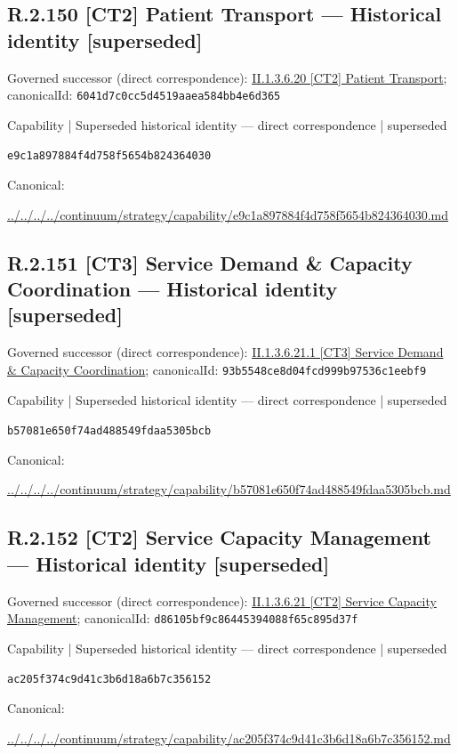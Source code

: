 \documentclass[10pt,a4paper]{article}
\begin{document}
\subsection*{R.2.150 [CT2] Patient Transport — Historical identity [superseded]}
Governed successor (direct correspondence): \hyperref[element-6041d7c0cc5d4519aaea584bb4e6d365]{II.1.3.6.20 [CT2] Patient Transport}; canonicalId: \texttt{6041d7c0cc5d4519aaea584bb4e6d365}\par
\label{element-e9c1a897884f4d758f5654b824364030}
{\small Capability | Superseded historical identity — direct correspondence | superseded}\par
\texttt{e9c1a897884f4d758f5654b824364030}\par
Canonical: \par
{\footnotesize\url{../../../../continuum/strategy/capability/e9c1a897884f4d758f5654b824364030.md}}\par
\subsection*{R.2.151 [CT3] Service Demand \& Capacity Coordination — Historical identity [superseded]}
Governed successor (direct correspondence): \hyperref[element-93b5548ce8d04fcd999b97536c1eebf9]{II.1.3.6.21.1 [CT3] Service Demand \& Capacity Coordination}; canonicalId: \texttt{93b5548ce8d04fcd999b97536c1eebf9}\par
\label{element-b57081e650f74ad488549fdaa5305bcb}
{\small Capability | Superseded historical identity — direct correspondence | superseded}\par
\texttt{b57081e650f74ad488549fdaa5305bcb}\par
Canonical: \par
{\footnotesize\url{../../../../continuum/strategy/capability/b57081e650f74ad488549fdaa5305bcb.md}}\par
\subsection*{R.2.152 [CT2] Service Capacity Management — Historical identity [superseded]}
Governed successor (direct correspondence): \hyperref[element-d86105bf9c86445394088f65c895d37f]{II.1.3.6.21 [CT2] Service Capacity Management}; canonicalId: \texttt{d86105bf9c86445394088f65c895d37f}\par
\label{element-ac205f374c9d41c3b6d18a6b7c356152}
{\small Capability | Superseded historical identity — direct correspondence | superseded}\par
\texttt{ac205f374c9d41c3b6d18a6b7c356152}\par
Canonical: \par
{\footnotesize\url{../../../../continuum/strategy/capability/ac205f374c9d41c3b6d18a6b7c356152.md}}\par
\end{document}
